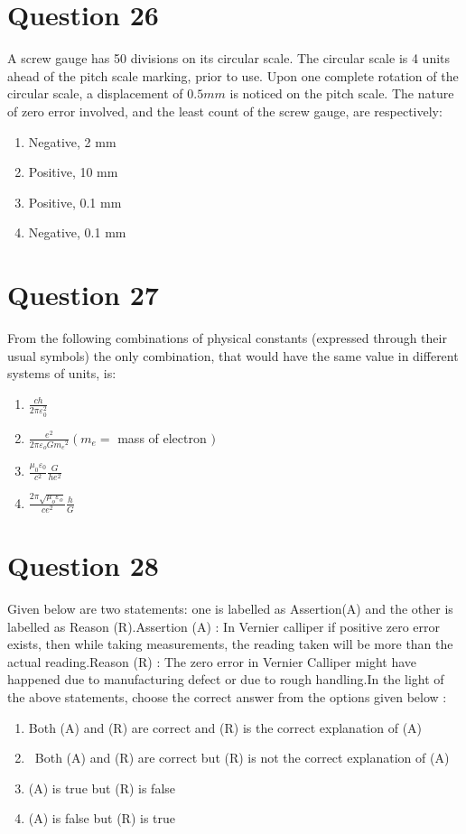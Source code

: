 \documentclass{article}
\begin{document}
\section*{Question 26}
A screw gauge has 50 divisions on its circular scale. The circular scale is 4 units ahead of the pitch scale marking, prior to use. Upon one complete rotation of the circular scale, a displacement of \(0.5 mm\) is noticed on the pitch scale. The nature of zero error involved, and the least count of the screw gauge, are respectively:
\begin{enumerate}[label=(\alph*)]
\item Negative, 2 mm
\item Positive, 10 mm
\item Positive, 0.1 mm
\item Negative, 0.1 mm
\end{enumerate}
\newpage
\section*{Question 27}
From the following combinations of physical constants (expressed through their usual symbols) the only combination, that would have the same value in different systems of units, is: 
\begin{enumerate}[label=(\alph*)]
\item \(\frac{c h}{2 \pi \varepsilon_0^2}\)
\item \(\frac{e^2}{2 \pi \varepsilon_o G m_e{ }^2}\left(m_e=\right.\) mass of electron \()\)
\item \(\frac{\mu_0 \varepsilon_0}{c^2} \frac{G}{h e^2}\)
\item \(\frac{2 \pi \sqrt{\mu_o \varepsilon_o}}{c e^2} \frac{h}{G}\)
\end{enumerate}
\newpage
\section*{Question 28}
Given below are two statements: one is labelled as Assertion(A) and the other is labelled as Reason (R).Assertion (A) : In Vernier calliper if positive zero error exists, then while taking measurements, the reading taken will be more than the actual reading.Reason (R) : The zero error in Vernier Calliper might have happened due to manufacturing defect or due to rough handling.In the light of the above statements, choose the correct answer from the options given below : 
\begin{enumerate}[label=(\alph*)]
\item Both (A) and (R) are correct and (R) is the correct explanation of (A)
\item  Both (A) and (R) are correct but (R) is not the correct explanation of (A)
\item (A) is true but (R) is false
\item (A) is false but (R) is true
\end{enumerate}
\newpage
\end{document}
